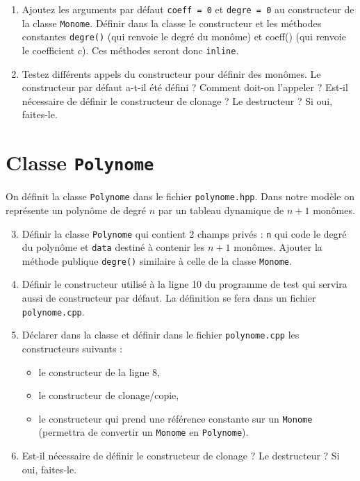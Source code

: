 \documentclass[a4paper,14pt]{article}
\begin{document}
\begin{enumerate}
    \item Ajoutez les arguments par défaut \texttt{coeff = 0} et \texttt{degre = 0} au constructeur de la classe \texttt{Monome}. Définir dans la classe le constructeur et les méthodes constantes \texttt{degre()} (qui renvoie le degré du monôme) et coeff() (qui renvoie le coefficient c). Ces méthodes seront donc \texttt{inline}.
    
    \item Testez différents appels du constructeur pour définir des monômes. Le constructeur par défaut a-t-il été défini ? Comment doit-on l'appeler ? Est-il nécessaire de définir le constructeur de clonage ? Le destructeur ? Si oui, faites-le.
\end{enumerate}

\section*{Classe \texttt{Polynome}}

On définit la classe \texttt{Polynome} dans le fichier \texttt{polynome.hpp}.
Dans notre modèle on représente un polynôme de degré $n$ par un tableau dynamique de $n+1$ monômes.

\begin{enumerate}
    \setcounter{enumi}{2}
    \item Définir la classe \texttt{Polynome} qui contient 2 champs privés : \texttt{n} qui code le degré du polynôme et \texttt{data} destiné à contenir les $n+1$ monômes. Ajouter la méthode publique \texttt{degre()} similaire à celle de la classe \texttt{Monome}.
    
    \item Définir le constructeur utilisé à la ligne 10 du programme de test qui servira aussi de constructeur par défaut. La définition se fera dans un fichier \texttt{polynome.cpp}.
    
    \item Déclarer dans la classe et définir dans le fichier \texttt{polynome.cpp} les constructeurs suivants :
    \begin{itemize}
        \item le constructeur de la ligne 8,
        \item le constructeur de clonage/copie,
        \item le constructeur qui prend une référence constante sur un \texttt{Monome} (permettra de convertir un \texttt{Monome} en \texttt{Polynome}).
    \end{itemize}
    
    \item Est-il nécessaire de définir le constructeur de clonage ? Le destructeur ? Si oui, faites-le.
\end{enumerate}
\end{document}
